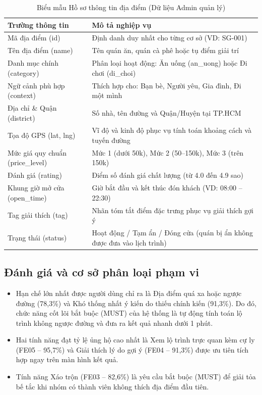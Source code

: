 \documentclass[13pt,a4paper]{extreport}
\newcommand{\hd}[1]{\centering\arraybackslash\textbf{#1}}
\begin{document}
\begin{table}[H]
\centering
\caption{Biểu mẫu Hồ sơ thông tin địa điểm (Dữ liệu Admin quản lý)}
\label{tab:form_place}
\setlength{\tabcolsep}{4pt}
\begin{tabular}{|L{4.0cm}|L{10.4cm}|}
\hline
\hd{Trường thông tin} & \hd{Mô tả nghiệp vụ} \\
\hline
Mã địa điểm (id) & Định danh duy nhất cho từng cơ sở (VD: SG-001) \\
\hline
Tên địa điểm (name) & Tên quán ăn, quán cà phê hoặc tụ điểm giải trí \\
\hline
Danh mục chính (category) & Phân loại hoạt động: Ăn uống (an\_uong) hoặc Đi chơi (di\_choi) \\
\hline
Ngữ cảnh phù hợp (context) & Thích hợp cho: Bạn bè, Người yêu, Gia đình, Đi một mình \\
\hline
Địa chỉ \& Quận (district) & Số nhà, tên đường và Quận/Huyện tại TP.HCM \\
\hline
Tọa độ GPS (lat, lng) & Vĩ độ và kinh độ phục vụ tính toán khoảng cách và tuyến đường \\
\hline
Mức giá quy chuẩn (price\_level) & Mức 1 (dưới 50k), Mức 2 (50--150k), Mức 3 (trên 150k) \\
\hline
Đánh giá (rating) & Điểm số đánh giá chất lượng (từ 4.0 đến 4.9 sao) \\
\hline
Khung giờ mở cửa (open\_time) & Giờ bắt đầu và kết thúc đón khách (VD: 08:00 -- 22:30) \\
\hline
Tag giải thích (tag) & Nhãn tóm tắt điểm đặc trưng phục vụ giải thích gợi ý \\
\hline
Trạng thái (status) & Hoạt động / Tạm ẩn / Đóng cửa (quán bị ẩn không được đưa vào lịch trình) \\
\hline
\end{tabular}
\end{table}

\subsection{Đánh giá và cơ sở phân loại phạm vi}
\begin{itemize}
    \item Hạn chế lớn nhất được người dùng chỉ ra là Địa điểm quá xa hoặc ngược đường (78,3\%) và Khó thống nhất ý kiến do thiếu chính kiến (91,3\%). Do đó, chức năng cốt lõi bắt buộc (MUST) của hệ thống là tự động tính toán lộ trình không ngược đường và đưa ra kết quả nhanh dưới 1 phút.
    \item Hai tính năng đạt tỷ lệ ủng hộ cao nhất là Xem lộ trình trực quan kèm cự ly (FE05 -- 95,7\%) và Giải thích lý do gợi ý (FE04 -- 91,3\%) được ưu tiên tích hợp ngay trên màn hình kết quả.
    \item Tính năng Xáo trộn (FE03 -- 82,6\%) là yêu cầu bắt buộc (MUST) để giải tỏa bế tắc khi nhóm có thành viên không thích địa điểm đầu tiên.
\end{itemize}
\end{document}

